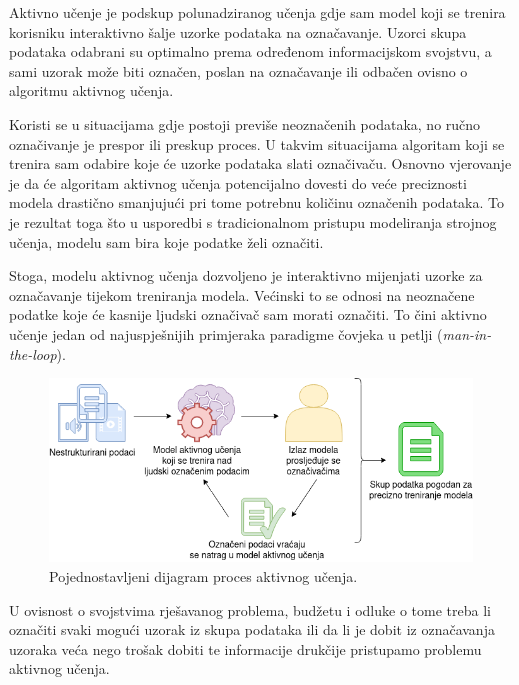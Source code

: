 \documentclass[times, utf8, zavrsni, numeric]{fer}
\begin{document}
Aktivno učenje je podskup polunadziranog učenja gdje sam model koji se trenira korisniku interaktivno šalje uzorke podataka na označavanje. Uzorci skupa podataka odabrani su optimalno prema određenom informacijskom svojstvu, a sami uzorak može biti označen, poslan na označavanje ili odbačen ovisno o algoritmu aktivnog učenja.

Koristi se u situacijama gdje postoji previše neoznačenih podataka, no ručno označivanje je prespor ili preskup proces. U takvim situacijama algoritam koji se trenira sam odabire koje će uzorke podataka slati označivaču. Osnovno vjerovanje je da će algoritam aktivnog učenja potencijalno dovesti do veće preciznosti modela drastično smanjujući pri tome potrebnu količinu označenih podataka. To je rezultat toga što u usporedbi s tradicionalnom pristupu modeliranja strojnog učenja, modelu sam bira koje podatke želi označiti.

Stoga, modelu aktivnog učenja dozvoljeno je interaktivno mijenjati uzorke za označavanje tijekom treniranja modela. Većinski to se odnosi na neoznačene podatke koje će kasnije ljudski označivač sam morati označiti. To čini aktivno učenje jedan od najuspješnijih primjeraka paradigme \glqq{}čovjeka u petlji\grqq{} (\textit{man-in-the-loop}).

\begin{figure}[H]
\centering
\includegraphics[width=\textwidth]{pictures/proces_aktivnog_ucenja.png}
\caption{Pojednostavljeni dijagram proces aktivnog učenja.}
\label{proces_aktivnog_ucenjga}
\end{figure}

U ovisnost o svojstvima rješavanog problema, budžetu i odluke o tome treba li označiti svaki mogući uzorak iz skupa podataka ili da li je dobit iz označavanja uzoraka veća nego trošak dobiti te informacije drukčije pristupamo problemu aktivnog učenja.
\end{document}
